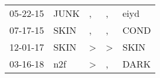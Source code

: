 \begin{supertabular}{lllll}
 05-22-15 &  JUNK &             , &             , &  eiyd \\
 07-17-15 &  SKIN &             , &             , &  COND \\
 12-01-17 &  SKIN &  \textgreater &  \textgreater &  SKIN \\
 03-16-18 &   n2f &  \textgreater &             , &  DARK \\
\end{supertabular}
